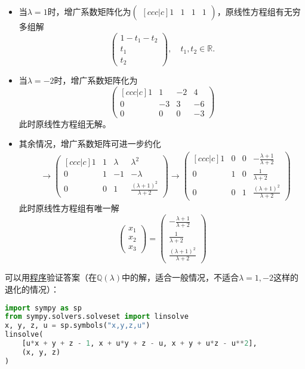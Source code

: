 \begin{itemize}
\item 当$\lambda = 1$时，增广系数矩阵化为$\begin{pmatrix}[ccc|c] 1 & 1 & 1 & 1 \end{pmatrix}$，原线性方程组有无穷多组解
$$\begin{pmatrix}
  1 - t_1 - t_2 \\ t_1 \\ t_2
\end{pmatrix}, \quad t_1, t_2 \in \mathbb{R}.$$
\item 当$\lambda = -2$时，增广系数矩阵化为
$$\begin{pmatrix}[ccc|c] 1 & 1 & -2 & 4 \\ 0 & -3 & 3 & -6 \\ 0 & 0 & 0 & -3 \end{pmatrix}$$
此时原线性方程组无解。
\item 其余情况，增广系数矩阵可进一步约化
\begin{align*}
& \to
\begin{pmatrix}[ccc|c]
  1 & 1 & \lambda & \lambda^2 \\
  0 & 1 & -1 & -\lambda \\
  0 & 0 & 1 & \frac{(\lambda+1)^2}{\lambda+2}
\end{pmatrix} \to
\begin{pmatrix}[ccc|c]
  1 & 0 & 0 & -\frac{\lambda+1}{\lambda+2} \\
  0 & 1 & 0 & \frac{1}{\lambda+2} \\
  0 & 0 & 1 & \frac{(\lambda+1)^2}{\lambda+2}
\end{pmatrix}
\end{align*}
此时原线性方程组有唯一解
$$
\begin{pmatrix} x_1 \\ x_2 \\ x_3 \end{pmatrix} = \begin{pmatrix} -\frac{\lambda+1}{\lambda+2} \\ \frac{1}{\lambda+2} \\ \frac{(\lambda+1)^2}{\lambda+2} \end{pmatrix}
$$
\end{itemize}

可以用\href{https://github.com/wenh06/buaa-advanced-algebra-2021/blob/master/notebooks/class-1.ipynb}{程序}验证答案（在$\mathbb{Q}(\lambda)$中的解，适合一般情况，不适合$\lambda = 1,-2$这样的退化的情况）：
\begin{center}
\begin{lstlisting}[language=Python]
import sympy as sp
from sympy.solvers.solveset import linsolve
x, y, z, u = sp.symbols("x,y,z,u")
linsolve(
    [u*x + y + z - 1, x + u*y + z - u, x + y + u*z - u**2],
    (x, y, z)
)
\end{lstlisting}
\end{center}

